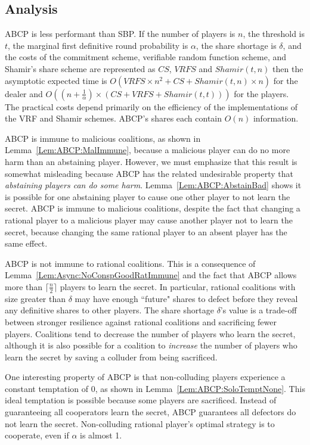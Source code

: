 \documentclass{dalcsthesis}
\begin{document}
\subsection{Analysis}

ABCP is less performant than SBP. If the number of players is $n$, the threshold is $t$, the marginal first definitive round probability is $\alpha$, the share shortage is $\delta$, and the costs of the commitment scheme, verifiable random function scheme, and Shamir's share scheme are represented as $CS$, $VRFS$ and $Shamir(t, n)$ then the asymptotic expected time is $O(VRFS  \times n^2 + CS + Shamir(t, n) \times n)$ for the dealer and $O((n + \frac{1}{\alpha}) \times (CS + VRFS + Shamir(t, t)))$ for the players. The practical costs depend primarily on the efficiency of the implementations of the VRF and Shamir schemes. ABCP's shares each contain $O(n)$ information.

ABCP is immune to malicious coalitions, as shown in Lemma~\ref{Lem:ABCP:MalImmune}, because a malicious player can do no more harm than an abstaining player. However, we must emphasize that this result is somewhat misleading because ABCP has the related undesirable property that \emph{abstaining players can do some harm}. Lemma~\ref{Lem:ABCP:AbstainBad} shows it is possible for one abstaining player to cause one other player to not learn the secret. ABCP is immune to malicious coalitions, despite the fact that changing a rational player to a malicious player may cause another player not to learn the secret, because changing the same rational player to an absent player has the same effect.

ABCP is not immune to rational coalitions. This is a consequence of Lemma~\ref{Lem:Async:NoConspGoodRatImmune} and the fact that ABCP allows more than $\lceil \frac{n}{2} \rceil$ players to learn the secret. In particular, rational coalitions with size greater than $\delta$ may have enough ``future" shares to defect before they reveal any definitive shares to other players. The share shortage $\delta$'s value is a trade-off between stronger resilience against rational coalitions and sacrificing fewer players. Coalitions tend to decrease the number of players who learn the secret, although it is also possible for a coalition to \emph{increase} the number of players who learn the secret by saving a colluder from being sacrificed.

One interesting property of ABCP is that non-colluding players experience a constant temptation of $0$, as shown in Lemma~\ref{Lem:ABCP:SoloTemptNone}. This ideal temptation is possible because some players are sacrificed. Instead of guaranteeing all cooperators learn the secret, ABCP guarantees all defectors do not learn the secret. Non-colluding rational player's optimal strategy is to cooperate, even if $\alpha$ is almost 1.
\end{document}
